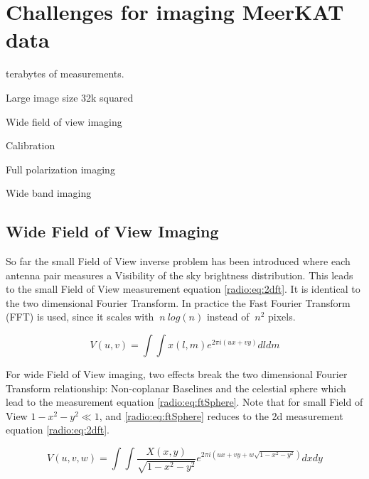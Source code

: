 \section{Challenges for imaging MeerKAT data} \label{meerkat}

terabytes of measurements.

Large image size 32k squared

Wide field of view imaging

Calibration

Full polarization imaging

Wide band imaging


\subsection{Wide Field of View Imaging} \label{wof}

So far the small Field of View inverse problem has been introduced where each antenna pair measures a Visibility of the sky brightness distribution. This leads to the small Field of View measurement equation \eqref{radio:eq:2dft}. It is identical to the two dimensional Fourier Transform. In practice the Fast Fourier Transform (FFT) is used, since it scales with $~n\:log(n)$ instead of $~n^2$ pixels.

\begin{equation}\label{radio:eq:2dft}
V(u, v) = \int\int x(l, m) e^{2 \pi i (ux+vy)} dl dm
\end{equation}

For wide Field of View imaging, two effects break the two dimensional Fourier Transform relationship: Non-coplanar Baselines and the celestial sphere which lead to the measurement equation \eqref{radio:eq:ftSphere}. Note that for small Field of View $1 - x^2 -y ^2 \ll 1$, and \eqref{radio:eq:ftSphere} reduces to the 2d measurement equation \eqref{radio:eq:2dft}.

\begin{equation}\label{radio:eq:ftSphere}
	V(u, v, w) = \int\int \frac{X(x, y)}{\sqrt{1 - x^2 - y ^2}} e^{2 \pi i (ux+vy+ w\sqrt{1 - x^2 - y ^2})}dx dy
\end{equation}

